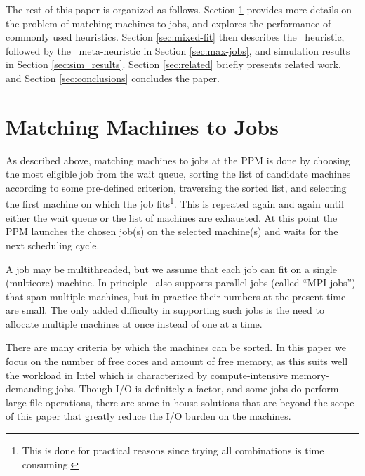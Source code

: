The rest of this paper is organized as follows.
Section \ref{sec:matching} provides more details on the problem of
matching machines to jobs, and explores the performance of commonly
used heuristics.
Section \ref{sec:mixed-fit} then describes the \mif\ heuristic,
followed by the \maj\ meta-heuristic in Section \ref{sec:max-jobs},
and simulation results in Section \ref{sec:sim_results}.
Section \ref{sec:related} briefly presents related work, and Section
\ref{sec:conclusions} concludes the paper.



\chapter{Matching Machines to Jobs}
\label{sec:matching}

As described above, matching machines to jobs at the PPM is done by
choosing the most eligible job from the wait queue, sorting the list
of candidate machines according to some pre-defined criterion,
traversing the sorted list, and selecting the first machine on which
the job fits\footnote{This is done for practical reasons since trying
  all combinations is time consuming.}.
This is repeated again and again until either the wait queue or the
list of machines are exhausted.
At this point the PPM launches the chosen job(s) on the selected
machine(s) and waits for the next scheduling cycle.

A job may be multithreaded, but we assume that each job can fit on a
single (multicore) machine.
In principle \nb\ also supports parallel jobs (called ``MPI jobs'')
that span multiple machines, but in practice their numbers at the
present time are small.
The only added difficulty in supporting such jobs is the need to
allocate multiple machines at once instead of one at a time.

There are many criteria by which the machines can be sorted.
In this paper we focus on the number of free cores and amount of free
memory, as this suits well the workload in Intel which is
characterized by compute-intensive memory-demanding jobs.
Though I/O is definitely a factor, and some jobs do perform large file
operations, there are some in-house solutions that are beyond the
scope of this paper that greatly reduce the I/O burden on the
machines.


